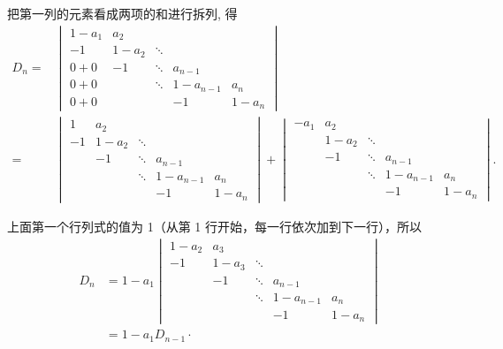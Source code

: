 \documentclass[12pt,fontset=fandol]{ctexart}
\begin{document}
\begin{solve}
把第一列的元素看成两项的和进行拆列, 得
    \begin{align*}
        D_n= & \begin{vmatrix}
                   1-a_{1} & a_{2}   &        &           &         \\
                   -1      & 1-a_{2} & \ddots &           &         \\
                   0 + 0   & -1      & \ddots & a_{n-1}   &         \\
                   0 + 0   &         & \ddots & 1-a_{n-1} & a_{n}   \\
                   0 + 0   &         &        & -1        & 1-a_{n}
               \end{vmatrix}                \\
        =    & \begin{vmatrix}
                   1  & a_{2}   &        &           &         \\
                   -1 & 1-a_{2} & \ddots &           &         \\
                      & -1      & \ddots & a_{n-1}   &         \\
                      &         & \ddots & 1-a_{n-1} & a_{n}   \\
                      &         &        & -1        & 1-a_{n}
               \end{vmatrix} + \begin{vmatrix}
                                   -a_{1} & a_{2}   &        &           &         \\
                                          & 1-a_{2} & \ddots &           &         \\
                                          & -1      & \ddots & a_{n-1}   &         \\
                                          &         & \ddots & 1-a_{n-1} & a_{n}   \\
                                          &         &        & -1        & 1-a_{n}
                               \end{vmatrix}.
    \end{align*}

    上面第一个行列式的值为 1（从第 1 行开始，每一行依次加到下一行），所以
    \[ \begin{aligned}
            D_n & =1-a_{1}\begin{vmatrix}
                              1-a_{2} & a_{3}   &        &           &         \\
                              -1      & 1-a_{3} & \ddots &           &         \\
                                      & -1      & \ddots & a_{n-1}   &         \\
                                      &         & \ddots & 1-a_{n-1} & a_{n}   \\
                                      &         &        & -1        & 1-a_{n}
                          \end{vmatrix} \\
                & =1-a_{1} D_{n-1} \cdot
        \end{aligned} \]


\end{solve}
\end{document}
